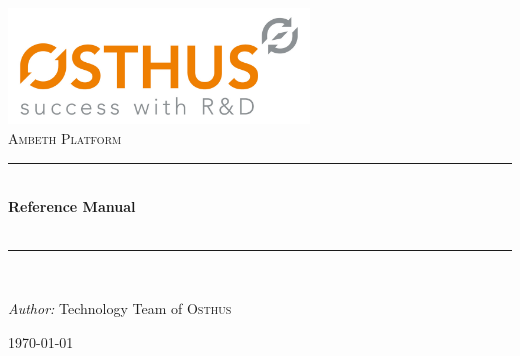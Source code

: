 \begin{titlepage}

\begin{center}


\includegraphics[width=0.6\textwidth]{img/2014-08-07-MG-Osthus_logo_RGB-high-res.jpg}\\[1cm]

\textsc{\huge Ambeth Platform}\\[1.5cm]

\newcommand{\HRule}{\rule{\linewidth}{0.5mm}}
\HRule \\[0.4cm]
{ \huge \bfseries Reference Manual}\\[0.4cm]
{ \huge \bfseries \version}\\[0.4cm]
\HRule \\[1.5cm]

\begin{minipage}{0.5\textwidth}
\begin{flushleft} \large
\emph{Author:} Technology Team of \textsc{Osthus}\\
\end{flushleft}
\end{minipage}

\vfill

{\large \today}

\end{center}

\end{titlepage}
